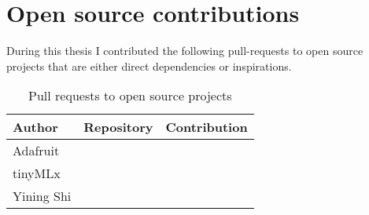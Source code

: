 \chapter{Open source contributions}

During this thesis I contributed the following \glspl{pull-request} to open source projects that are either direct dependencies or inspirations.

\begin{table}[ht]
    \centering
    \begin{tabular}{ | l | l | l |}
        \hline
        Author & Repository & Contribution \\
        \hline
        Adafruit & \cite[Adafruit{\_}SSD1306]{repository-adafruit-adafruit_ssd1306} & \cite[Format binary numbers]{pull-request-adafruit-adafruit_ssd1306} \\
        \hline
        tinyMLx & \cite[TinyMLx Arduino Library]{repository-tinymlx-arduino-library} & \cite[Update architecture name]{pull-request-tinymlx-arduino-library} \\
        \hline
        Yining Shi & \cite[ML for Physical Computing]{repository-yining1023-machine-learning-for-physical-computing} & \cite[Fixed some typos]{pull-request-yining1023-machine-learning-for-physical-computing} \\
        \hline
    \end{tabular}
    \caption{Pull requests to open source projects}
    \label{table:open-source-pull-requests}
\end{table}{}
